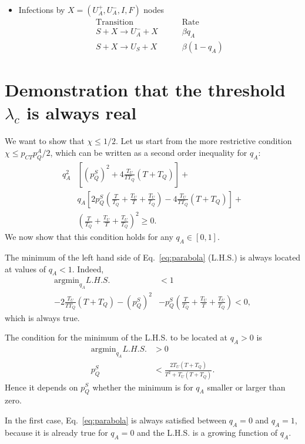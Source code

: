 \documentclass[aps,twocolumn,superscriptaddress,nofootinbib,pre,floatfix]{revtex4-1}
\begin{document}
\begin{itemize}
  
\item
  Infections by $X=(U_A^+,U_A^-,I,F)$ nodes
  \begin{eqnarray} \nonumber
    \textrm{Transition} & ~~~~~~ & \textrm{Rate} \\ \nonumber
    S+X \to U_A^-+X & &\beta q_A \\ \nonumber
    S+X \to U_S+X & &\beta (1-q_A)
\end{eqnarray}

  
\end{itemize}
  

\section{Demonstration that the threshold $\lambda_c$ is always real}
\label{lambdareal}
We want to show that $\chi \le 1/2$. Let us start from the
more restrictive condition $\chi \leq p_{CT}p_Q^A/2$, which can be written
as a second order inequality for $q_A$:
\begin{align}
    q_A^2 &\left[ (p_Q^S)^2 + 4 \frac{T_U}{T T_Q} (T+T_Q) \right] + \nonumber\\
    &q_A \left[ 2 p_Q^S \left(\frac{T}{T_Q} + \frac{T_U}{T} + \frac{T_U}{T_Q}\right) - 4 \frac{T_U}{T T_Q} (T + T_Q)\right] + \nonumber\\
    &\left(\frac{T}{T_Q} + \frac{T_U}{T} + \frac{T_U}{T_Q}\right)^2\geq 0.
    \label{eq:parabola}
\end{align}
We now show that this condition holds for any $q_A\in [0,1]$.

The minimum of the left hand side of Eq.~\eqref{eq:parabola} (L.H.S.)
is always located at values of $q_A < 1$. Indeed,
\begin{align}
    \text{argmin}_{q_A}L.H.S. &< 1 \nonumber\\ -2\frac{T_U}{T T_Q}
    (T+T_Q) - (p_Q^S)^2 &- p_Q^S(\frac{T}{T_Q} + \frac{T_U}{T} +
    \frac{T_U}{T_Q}) < 0,
\end{align}
which is always true.

The condition for the minimum of the L.H.S. to be located
at $q_A>0$ is
\begin{align}
\text{argmin}_{q_A}L.H.S. &>0 \nonumber\\
    p_Q^S &< \frac{2 T_U (T+T_Q)}{T^2 + T_U(T + T_Q)}.
    \label{eq:condition_qA_pos}
\end{align}
Hence it depends on $p_Q^S$ whether the minimum is for $q_A$ smaller
or larger than zero.

In the first case, Eq.~\eqref{eq:parabola} is always satisfied between
$q_A = 0$ and $q_A = 1$, because it is already true for $q_A=0$ and the
L.H.S. is a growing function of $q_A$.
\end{document}
